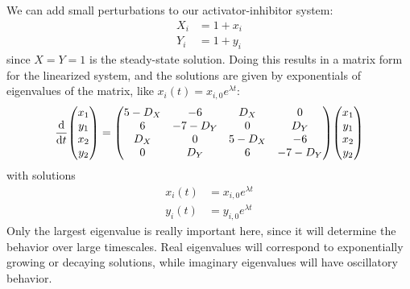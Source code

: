 \documentclass[a4paper,twoside,master.tex]{subfiles}
\begin{document}

We can add small perturbations to our activator-inhibitor system:
\begin{align}
    X_i &= 1 + x_i \\
    Y_i &= 1 + y_i
\end{align}
since $ X = Y = 1 $ is the steady-state solution. Doing this results in a matrix form for the linearized system, and the solutions are given by exponentials of eigenvalues of the matrix, like $ x_i(t) = x_{i,0} e^{\lambda t} $:
\begin{equation}
    \dv{t} \mqty(x_1 \\ y_1 \\ x_2 \\ y_2) = \mqty(5-D_X & -6 & D_X & 0\\6 & -7-D_Y & 0 & D_Y\\D_X & 0 & 5 - D_X & -6\\0 & D_Y & 6 & -7-D_Y) \mqty(x_1 \\ y_1 \\ x_2 \\ y_2)
\end{equation}
with solutions
\begin{align}
    x_i(t) &= x_{i,0} e^{\lambda t} \\
    y_i(t) &= y_{i,0} e^{\lambda t}
\end{align}
Only the largest eigenvalue is really important here, since it will determine the behavior over large timescales. Real eigenvalues will correspond to exponentially growing or decaying solutions, while imaginary eigenvalues will have oscillatory behavior.
\end{document}
